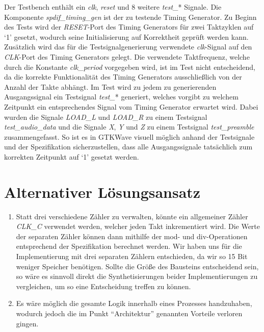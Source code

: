 \documentclass[12pt,a4paper]{article}
\begin{document}
Der Testbench enthält ein \emph{clk}, \emph{reset} und 8 weitere \emph{test\_}* Signale. Die Komponente \emph{spdif\_timing\_gen} ist der zu testende Timing Generator.\newline
\newline
Zu Beginn des Tests wird der \emph{RESET}-Port des Timing Generators für zwei Taktzyklen auf ‘1’ gesetzt, wodurch seine Initialisierung auf Korrektheit geprüft werden kann.\newline
Zusätzlich wird das für die Testsignalgenerierung verwendete \emph{clk}-Signal auf den \emph{CLK}-Port des Timing Generators gelegt. Die verwendete Taktfrequenz, welche durch die Konstante \emph{clk\_period} vorgegeben wird, ist im Test nicht entscheidend, da die korrekte Funktionalität des Timing Generators ausschließlich von der Anzahl der Takte abhängt.\newline
Im Test wird zu jedem zu generierenden Ausgangssignal ein Testsignal \emph{test\_}* generiert, welches vorgibt zu welchem Zeitpunkt ein entsprechendes Signal vom Timing Generator erwartet wird. Dabei wurden die Signale \emph{LOAD\_L} und \emph{LOAD\_R} zu einem Testsignal \emph{test\_audio\_data} und die Signale \emph{X}, \emph{Y} und \emph{Z} zu einem Testsignal \emph{test\_preamble} zusammengefasst. So ist es in GTKWave visuell möglich anhand der Testsignale und der Spezifikation sicherzustellen, dass alle Ausgangssignale tatsächlich zum korrekten Zeitpunkt auf ‘1’ gesetzt werden.

\section{Alternativer Lösungsansatz}

\begin{enumerate}
\item Statt drei verschiedene Zähler zu verwalten, könnte ein allgemeiner Zähler \emph{CLK\_C} verwendet werden, welcher jeden Takt inkrementiert wird. Die Werte der separaten Zähler können dann mithilfe der mod- und div-Operationen entsprechend der Spezifikation berechnet werden.
Wir haben uns für die Implementierung mit drei separaten Zählern entschieden, da wir so 15 Bit weniger Speicher benötigen. \newline
Sollte die Größe des Bausteins entscheidend sein, so wäre es sinnvoll direkt die Synthetisierungen beider Implementierungen zu vergleichen, um so eine Entscheidung treffen zu können.

\item Es wäre möglich die gesamte Logik innerhalb eines Prozesses handzuhaben, wodurch jedoch die im Punkt “Architektur” genannten Vorteile verloren gingen.
\end{enumerate}
\end{document}
